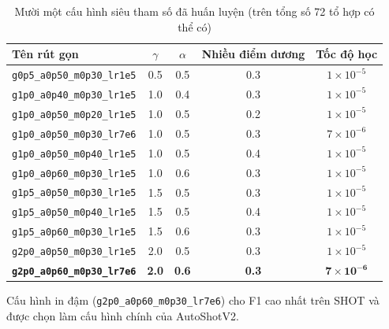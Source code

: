 \begin{table}[H]
\centering
\small
\caption{Mười một cấu hình siêu tham số đã huấn luyện (trên tổng số 72 tổ hợp có thể có)}
\label{tab:hparam_configs}
\begin{tabular}{lcccc}
\toprule
\textbf{Tên rút gọn} & \textbf{$\gamma$} & \textbf{$\alpha$} & \textbf{Nhiều điểm dương} & \textbf{Tốc độ học} \\
\midrule
\texttt{g0p5\_a0p50\_m0p30\_lr1e5} & 0.5 & 0.5 & 0.3 & $1\times10^{-5}$ \\
\texttt{g1p0\_a0p40\_m0p30\_lr1e5} & 1.0 & 0.4 & 0.3 & $1\times10^{-5}$ \\
\texttt{g1p0\_a0p50\_m0p20\_lr1e5} & 1.0 & 0.5 & 0.2 & $1\times10^{-5}$ \\
\texttt{g1p0\_a0p50\_m0p30\_lr7e6} & 1.0 & 0.5 & 0.3 & $7\times10^{-6}$ \\
\texttt{g1p0\_a0p50\_m0p40\_lr1e5} & 1.0 & 0.5 & 0.4 & $1\times10^{-5}$ \\
\texttt{g1p0\_a0p60\_m0p30\_lr1e5} & 1.0 & 0.6 & 0.3 & $1\times10^{-5}$ \\
\texttt{g1p5\_a0p50\_m0p30\_lr1e5} & 1.5 & 0.5 & 0.3 & $1\times10^{-5}$ \\
\texttt{g1p5\_a0p50\_m0p40\_lr1e5} & 1.5 & 0.5 & 0.4 & $1\times10^{-5}$ \\
\texttt{g1p5\_a0p60\_m0p30\_lr1e5} & 1.5 & 0.6 & 0.3 & $1\times10^{-5}$ \\
\texttt{g2p0\_a0p50\_m0p30\_lr1e5} & 2.0 & 0.5 & 0.3 & $1\times10^{-5}$ \\
\textbf{\texttt{g2p0\_a0p60\_m0p30\_lr7e6}} & \textbf{2.0} & \textbf{0.6} & \textbf{0.3} & $\mathbf{7\times10^{-6}}$ \\
\bottomrule
\end{tabular}
\end{table}

\noindent Cấu hình in đậm (\texttt{g2p0\_a0p60\_m0p30\_lr7e6}) cho F1 cao nhất trên SHOT và được chọn làm cấu hình chính của AutoShotV2.
